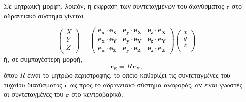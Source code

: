 Σε μητρωική μορφή, λοιπόν, η έκφραση των συντεταγμένων του διανύσματος 
\(\mathbf{r}\) στο αδρανειακό σύστημα γίνεται 

\begin{equation*}
    \begin{pmatrix}
        X \\
        Y \\
        Z \\
    \end{pmatrix} = 
    \begin{pmatrix}
        \mathbf{e_{x}} \cdot \mathbf{e_{X}} & 
            \mathbf{e_{y}} \cdot \mathbf{e_{X}} &
            \mathbf{e_{z}} \cdot \mathbf{e_{X}} \\
        \mathbf{e_{x}} \cdot \mathbf{e_{Y}} & 
            \mathbf{e_{y}} \cdot \mathbf{e_{Y}} &
            \mathbf{e_{z}} \cdot \mathbf{e_{Y}} \\
        \mathbf{e_{x}} \cdot \mathbf{e_{Z}} & 
            \mathbf{e_{y}} \cdot \mathbf{e_{Z}} &
            \mathbf{e_{z}} \cdot \mathbf{e_{Z}}
    \end{pmatrix}
    \begin{pmatrix}
        x \\
        y \\
        z \\
    \end{pmatrix}
\end{equation*}
ή, σε συμπαγέστερη μορφή,
\begin{equation}
    \mathbf{r}_{E} = R\, \mathbf{r}_{B},
    \label{knm:rot_e_b}
\end{equation}
όπου \(R\) είναι το μητρώο περιστροφής, το οποίο καθορίζει τις συντεταγμένες 
του τυχαίου διανύσματος \(\mathbf{r}\) ως προς το αδρανειακό σύστημα αναφοράς, 
αν είναι γνωστές οι συντεταγμένες του \(\mathbf{r}\) στο κεντροβαρικό. 

